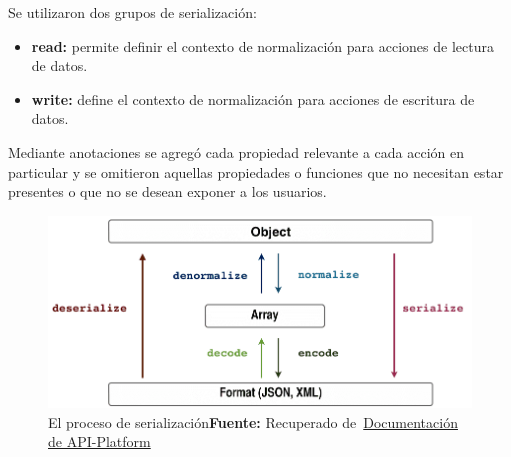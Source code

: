 

Se utilizaron dos grupos de serialización:

\begin{itemize}
    \item \textbf{read:} permite definir el contexto de normalización para acciones de lectura de datos.
    \item \textbf{write:} define el contexto de normalización para acciones  de escritura de datos.
\end{itemize}

Mediante anotaciones se agregó cada propiedad relevante a cada acción en particular y se omitieron aquellas propiedades o funciones que no necesitan estar
presentes o que no se desean exponer a los usuarios.



\begin{figure}[h]
    \includegraphics[width=1\linewidth]{image/serializationWorkflow.png}
    \caption{El proceso de serialización\newline \textbf{Fuente:} Recuperado de~\href{https://api-platform.com/docs/core/serialization/}{Documentación de API-Platform}}
    \label{fig:image/serializationWorkflow}
\end{figure}





